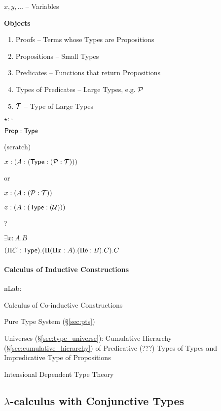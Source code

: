$x,y,\ldots$ -- Variables


\textbf{Objects}

\begin{enumerate}
  \item Proofs -- Terms whose Types are Propositions
  \item Propositions -- Small Types
  \item Predicates -- Functions that return Propositions
  \item Types of Predicates -- Large Types, e.g. $\mathcal{P}$
  \item $\mathcal{T}$ -- Type of Large Types
\end{enumerate}

$\star:\square$

$\mathsf{Prop}:\mathsf{Type}$


\asterism


(scratch)

$x:(A:(\mathsf{Type}:(\mathcal{P}:\mathcal{T})))$

or

$x:(A:(\mathcal{P}:\mathcal{T}))$

$x:(A:(\mathsf{Type}:(\mathcal{U})))$

?


$\exists x:A.B$

$(\Pi C:\mathsf{Type}).(\Pi (\Pi x:A).(\Pi b:B).C).C$



\paragraph{Calculus of Inductive Constructions}\label{sec:cic}

nLab:

Calculus of Co-inductive Constructions

Pure Type System (\S\ref{sec:pts})

Universes (\S\ref{sec:type_universe}): Cumulative Hierarchy
(\S\ref{sec:cumulative_hierarchy}) of Predicative (???) Types of Types
and Impredicative Type of Propositions %

Intensional Dependent Type Theory



\subsection{$\lambda$-calculus with Conjunctive Types}
\label{sec:conjunctive_lambda}

